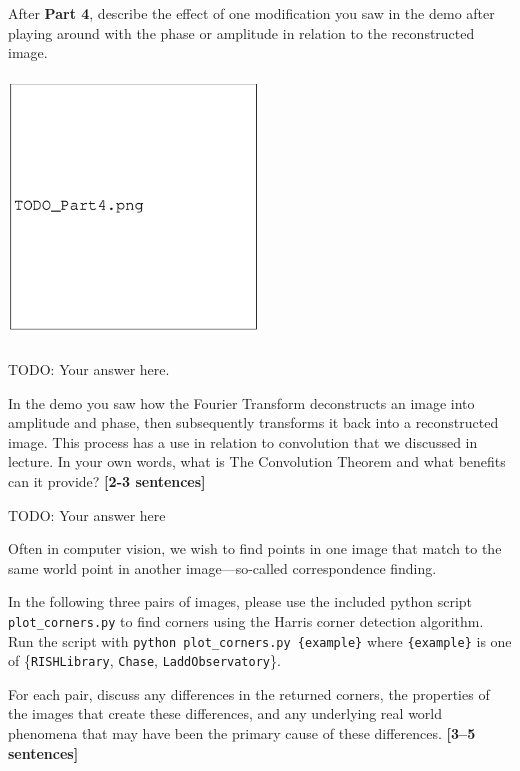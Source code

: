 \documentclass{csci1430}
\begin{document}
\begin{subquestion}[points=2]
After \textbf{Part 4}, describe the effect of one modification you saw in the demo after playing around with the phase or amplitude in relation to the reconstructed image.
\end{subquestion}

\begin{answer}
\includegraphics[width=0.5\textwidth,height=7cm,keepaspectratio]{images/TODO_Part4.png}
    
TODO: Your answer here.
\end{answer}

\newpage

\begin{subquestion}[points=2]
In the demo you saw how the Fourier Transform deconstructs an image into amplitude and phase, then subsequently transforms it back into a reconstructed image. This process has a use in relation to convolution that we discussed in lecture. In your own words, what is The Convolution Theorem and what benefits can it provide? \textbf{[2-3 sentences]}
\end{subquestion}

\begin{answer}
TODO: Your answer here
\end{answer}


\pagebreak


Often in computer vision, we wish to find points in one image that match to the same world point in another image---so-called correspondence finding.

\begin{question}[points=9] 
In the following three pairs of images, please use the included python script \texttt{plot\_corners.py} to find corners using the Harris corner detection algorithm. Run the script with \texttt{python plot\_corners.py \{example\}} where \texttt{\{example\}} is one of \{\texttt{RISHLibrary}, \texttt{Chase}, \texttt{LaddObservatory}\}.

For each pair, discuss any differences in the returned corners, the properties of the images that create these differences, and any underlying real world phenomena that may have been the primary cause of these differences. \textbf{[3--5 sentences]}
\end{question}
\end{document}
